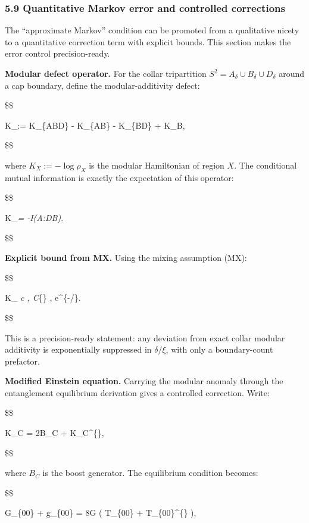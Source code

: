 \documentclass[11pt,a4paper]{article}
\theoremstyle{remark}
\begin{document}
\subsubsection{5.9 Quantitative Markov error and controlled corrections}\label{quantitative-markov-error-and-controlled-corrections}

The ``approximate Markov'' condition can be promoted from a qualitative nicety to
a quantitative correction term with explicit bounds. This section makes the
error control precision-ready.

\textbf{Modular defect operator.} For the collar tripartition \(S^2 = A_\delta \cup
B_\delta \cup D_\delta\) around a cap boundary, define the modular-additivity
defect:

\$\$

\Delta K\_\delta := K\_\{ABD\} - K\_\{AB\} - K\_\{BD\} + K\_B,

\$\$

where \(K_X := -\log \rho_X\) is the modular Hamiltonian of region \(X\). The
conditional mutual information is exactly the expectation of this operator:

\$\$

\langle \Delta K\_\delta \rangle\emph{\omega = -I(A:D\textbar B)}\omega.

\$\$

\textbf{Explicit bound from MX.} Using the mixing assumption (MX):

\$\$

\left\textbar{} \langle \Delta K\_\delta \rangle\emph{\omega \right\textbar{}
\le c , \textbar{}\partial C\textbar{}}\{\} , e\^{}\{-\delta/\xi\}.

\$\$

This is a precision-ready statement: any deviation from exact collar modular
additivity is exponentially suppressed in \(\delta/\xi\), with only a
boundary-count prefactor.

\textbf{Modified Einstein equation.} Carrying the modular anomaly through the
entanglement equilibrium derivation gives a controlled correction. Write:

\$\$

K\_C = 2\pi B\_C + K\_C\^{}\{\},

\$\$

where \(B_C\) is the boost generator. The equilibrium condition becomes:

\$\$

G\_\{00\} + \Lambda g\_\{00\} = 8\pi G \left( \langle T\_\{00\} \rangle
+ \langle T\_\{00\}\^{}\{\} \rangle \right),
\end{document}
